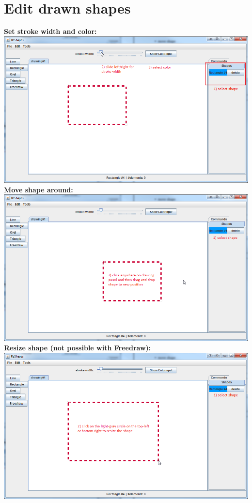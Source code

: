 \section{Edit drawn shapes}

\textbf{Set stroke width and color:} \\
\includegraphics[width=1\textwidth]{img/set_stroke} \\

\textbf{Move shape around:} \\
\includegraphics[width=1\textwidth]{img/move_shape} \\

\textbf{Resize shape (not possible with Freedraw):} \\
\includegraphics[width=1\textwidth]{img/resize_shape}

